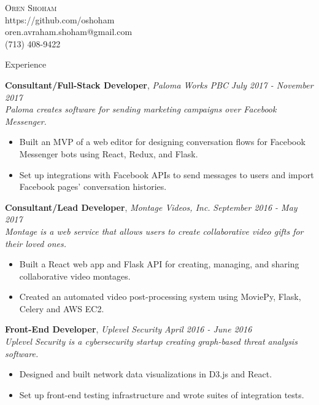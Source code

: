 \documentclass[9pt]{article}
\newenvironment{changemargin}[2]{%
  \begin{list}{}{%
    \setlength{\topsep}{0pt}%
    \setlength{\leftmargin}{#1}%
    \setlength{\rightmargin}{#2}%
    \setlength{\listparindent}{\parindent}%
    \setlength{\itemindent}{\parindent}%
    \setlength{\parsep}{\parskip}%
  }%
  \item[]}{\end{list}
}
\newcommand{\lineover}{
	\begin{changemargin}{-0.05in}{-0.05in}
		\vspace*{-8pt}
		\hrulefill \\
		\vspace*{-2pt}
	\end{changemargin}
}
\newcommand{\header}[1]{
	\begin{changemargin}{-0.5in}{-0.5in}
		\scshape{#1}\\
  	\lineover
	\end{changemargin}
}
\newcommand{\contact}[5]{
	\begin{changemargin}{-0.5in}{-0.5in}
		\begin{center}
			{\Large \scshape {#1}}\\ \smallskip
			{#2}\\ \smallskip
			{#3}\\ \smallskip
			{#4}\smallskip
		\end{center}
	\end{changemargin}
}
\newenvironment{body} {
	\vspace*{-16pt}
	\begin{changemargin}{-0.25in}{-0.5in}
  }
	{\end{changemargin}
}
\begin{document}

\contact{Oren Shoham}{https://github.com/oshoham}{oren.avraham.shoham@gmail.com}{(713) 408-9422}



\header{Experience}

\begin{body}
	\vspace{14pt}

	\textbf{Consultant/Full-Stack Developer}, \emph{Paloma Works PBC} \hfill  \emph{July 2017 - November 2017}\\
	\emph{Paloma creates software for sending marketing campaigns over Facebook Messenger.}
	\vspace*{-4pt}
	\begin{itemize} \itemsep -0pt  %
		\item Built an MVP of a web editor for designing conversation flows for Facebook Messenger bots using React, Redux, and Flask.
		\item Set up integrations with Facebook APIs to send messages to users and import Facebook pages' conversation histories.
	\end{itemize}

	\textbf{Consultant/Lead Developer}, \emph{Montage Videos, Inc.} \hfill  \emph{September 2016 - May 2017}\\
	\emph{Montage is a web service that allows users to create collaborative video gifts for their loved ones.}
	\vspace*{-4pt}
	\begin{itemize} \itemsep -0pt  %
	    \item Built a React web app and Flask API for creating, managing, and sharing collaborative video montages.
		\item Created an automated video post-processing system using MoviePy, Flask, Celery and AWS EC2.
	\end{itemize}

	\textbf{Front-End Developer}, \emph{Uplevel Security} \hfill \emph{April 2016 - June 2016}\\
	\emph{Uplevel Security is a cybersecurity startup creating graph-based threat analysis software.}
	\vspace*{-4pt}
	\begin{itemize} \itemsep -0pt  %
		\item Designed and built network data visualizations in D3.js and React.
		\item Set up front-end testing infrastructure and wrote suites of integration tests.
	\end{itemize}


\end{body}
\end{document}
